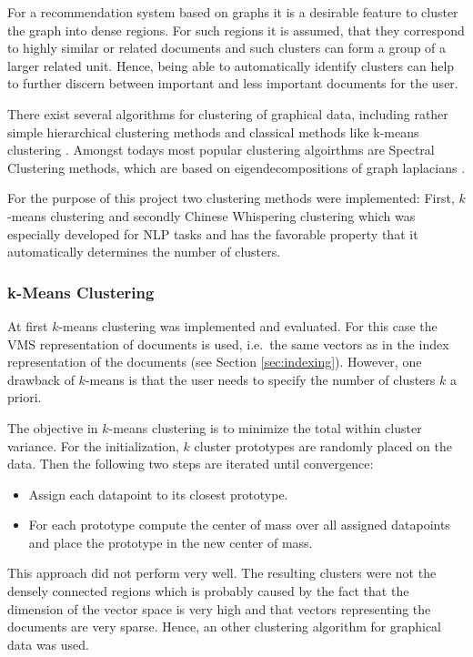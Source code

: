 For a recommendation system based on graphs it is a desirable feature to cluster the graph into
dense regions. For such regions it is assumed, that they correspond to highly similar or related
documents and such clusters can form a group of a larger related unit. Hence, being able to
automatically identify clusters can help to further discern between important and less important
documents for the user.

There exist several algorithms for clustering of graphical data, including rather simple
hierarchical clustering methods and classical methods like k-means clustering
\cite{2}. Amongst todays most popular clustering algoirthms are Spectral Clustering
methods, which are based on eigendecompositions of graph laplacians \cite{spectral_clustering}.

For the purpose of this project two clustering methods were implemented: First, $k$-means clustering
and secondly Chinese Whispering clustering which was especially developed for NLP tasks and has the
favorable property that it automatically determines the number of clusters.

\subsubsection{k-Means Clustering}
\label{sec:k-means_clustering}
At first $k$-means clustering was implemented and evaluated. For this case the VMS representation of
documents is used, i.e.\ the same vectors as in the index representation of the documents (see
Section \ref{sec:indexing}). However, one drawback of $k$-means is that the user needs to specify
the number of clusters $k$ a priori.

The objective in $k$-means clustering is to minimize the total within cluster variance. For the
initialization, $k$ cluster prototypes are randomly placed on the data. Then the following two
steps are iterated until convergence:
\begin{itemize}
  \item Assign each datapoint to its closest prototype.
  \item For each prototype compute the center of mass over all assigned datapoints and place the
prototype in the new center of mass.
\end{itemize}

This approach did not perform very well. The resulting clusters were not the densely connected
regions which is probably caused by the fact that the dimension of the vector space is very high
and that vectors representing the documents are very sparse. Hence, an other clustering algorithm
for graphical data was used.

